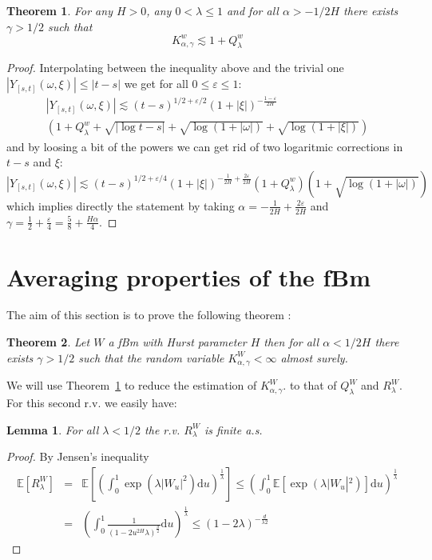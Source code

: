 \documentclass[11pt,a4paper,draft,reqno]{amsart}
\newtheorem{lemma}{Lemma}
\newtheorem{theorem}{Theorem}
\theoremstyle{definition}
\newcommand{\expect}{\mathbb{E}}
\newcommand{\dd}{\mathrm{d}}
\newcommand{\eps}{\varepsilon}
\begin{document}
\begin{theorem}\label{theorem majoration K}
For any $H> 0$, any $0<\lambda\le1$ and for all $\alpha>-1/2H$ there exists $\gamma > 1/2$ such that 
$$
K^w_{\alpha,\gamma} \lesssim 1+ Q^w_\lambda
$$
\end{theorem}
\begin{proof}
Interpolating between the inequality above  and the trivial one
$
|Y_{[s,t]}(\omega,\xi)| \le |t-s|
$
we get for all $0\le  \eps \le 1$:
\begin{multline*}
\left|Y_{[s,t]}(\omega,\xi)\right| \lesssim (t-s)^{1/2+\eps/2} (1+|\xi|)^{-\frac {1-\eps} {2H}}\\
\left(1+Q^w_\lambda+\sqrt{|\log t-s|} + \sqrt{\log (1+|\omega|)} + \sqrt{\log(1+ |\xi|)} \right)
\end{multline*}
and by loosing a bit of the powers we can get rid of two logaritmic corrections in $t-s$ and $\xi$:
$$\left|Y_{[s,t]}(\omega,\xi)\right| \lesssim (t-s)^{1/2+\eps/4} (1+|\xi|)^{-\frac {1} {2H}+\frac {2\eps} {2H}}\left(1+Q^w_\lambda\right)\left(1+ \sqrt{\log (1+ |\omega|)} \right)$$
which implies directly the statement by taking $\alpha=-\frac1{2H}+\frac{2\eps}{2H}$ and $\gamma=\frac12+\frac\eps4=\frac58+\frac{H\alpha}4$.
\end{proof}





\section{Averaging properties of the fBm}
\label{sec:prob-fbm}

The aim of this section is to prove the following theorem :

\begin{theorem}\label{probabilistic estimate}
Let $W$ a fBm with Hurst parameter $H$ then for all $\alpha < 1/2H$ there exists $\gamma > 1/2$ such that  the random variable $K^W_{\alpha,\gamma}<\infty$ almost surely. 
\end{theorem}
We will use Theorem~\ref{theorem majoration K} to reduce the estimation of $K^W_{\alpha,\gamma}$.
 to that of $Q^W_\lambda$ and $R^W_\lambda$. For this second r.v. we easily have:
\begin{lemma}
For all $\lambda<1/2$  the r.v. $R^W_\lambda$ is finite a.s.
\end{lemma}
\begin{proof}
By Jensen's inequality
\begin{eqnarray*}
\expect\left[R^W_\lambda\right]
&=&
\expect\left[\left(\int_0^1\exp\left(\lambda |W_ u|^2\right)\dd u\right)^{\frac1\lambda}\right]
\le
\left(\int_0^1 \expect\left[\exp \left(\lambda \right|W_u\left|^2\right)\right]\dd u \right)^{\frac1\lambda}\\
&=&
\left(\int_0^1 \frac 1 {(1-2u^{2H}\lambda)^{\frac d2}}\dd u\right)^\frac1\lambda
\le
(1-2\lambda)^{-\frac d{\lambda2}}
\end{eqnarray*}
\end{proof}
\end{document}
